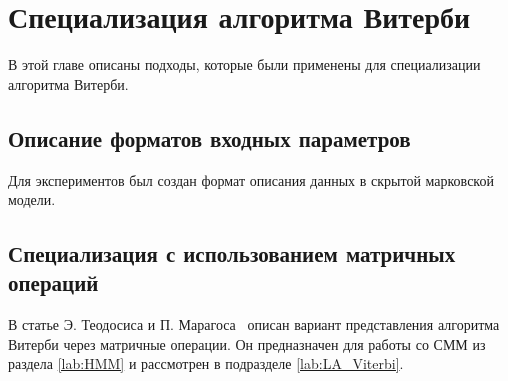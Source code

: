 \section{Специализация алгоритма Витерби}
В этой главе описаны подходы, которые были применены для 
специализации алгоритма Витерби.

\subsection{Описание форматов входных параметров}
Для экспериментов был создан формат описания данных в скрытой марковской модели.

\subsection{Специализация с использованием матричных\\ операций}
В статье Э. Теодосиса и П. Марагоса~\cite{LA_Viterbi} описан 
вариант представления алгоритма Витерби через матричные 
операции.
Он предназначен для работы со СММ из раздела 
\ref{lab:HMM} и рассмотрен в подразделе 
\ref{lab:LA_Viterbi}.


